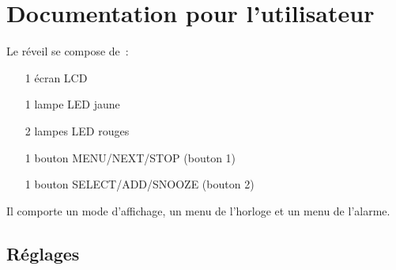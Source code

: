 \documentclass[12pt,a4paper]{article}
\begin{document}
\section{Documentation pour l'utilisateur}

Le réveil se compose de~:
\begin{itemize}
\item[1] écran LCD
\item[1] lampe LED jaune
\item[2] lampes LED rouges
\item[1] bouton MENU/NEXT/STOP (bouton 1)
\item[1] bouton SELECT/ADD/SNOOZE (bouton 2)
\end{itemize}

Il comporte un mode d'affichage, un menu de l'horloge et un menu de l'alarme.

\subsection{Réglages}
\end{document}
